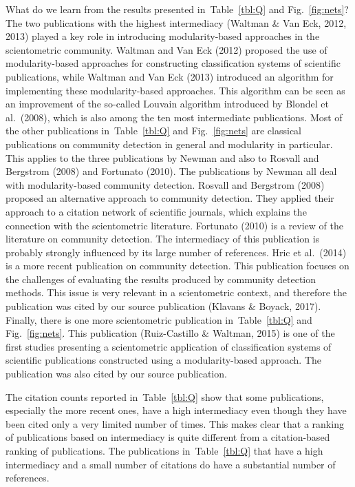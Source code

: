 \documentclass{article}
\theoremstyle{definition}
\newcommand{\figref}[1]{Fig.~\ref{fig:#1}\xspace}
\newcommand{\tblref}[1]{Table~\ref{tbl:#1}\xspace}
\begin{document}
What do we learn from the results presented in~\tblref{Q} and \figref{nets}? The two publications with the highest intermediacy (Waltman \& Van Eck, 2012, 2013) played a key role in introducing modularity-based approaches in the scientometric community. Waltman and Van Eck (2012) proposed the use of modularity-based approaches for constructing classification systems of scientific publications, while Waltman and Van Eck (2013) introduced an algorithm for implementing these modularity-based approaches. This algorithm can be seen as an improvement of the so-called Louvain algorithm introduced by Blondel et al.\ (2008), which is also among the ten most intermediate publications. Most of the other publications in~\tblref{Q} and \figref{nets} are classical publications on community detection in general and modularity in particular. This applies to the three publications by Newman and also to Rosvall and Bergstrom (2008) and Fortunato (2010). The publications by Newman all deal with modularity-based community detection. Rosvall and Bergstrom (2008) proposed an alternative approach to community detection. They applied their approach to a citation network of scientific journals, which explains the connection with the scientometric literature. Fortunato (2010) is a review of the literature on community detection. The intermediacy of this publication is probably strongly influenced by its large number of references. Hric et al.\ (2014) is a more recent publication on community detection. This publication focuses on the challenges of evaluating the results produced by community detection methods. This issue is very relevant in a scientometric context, and therefore the publication was cited by our source publication (Klavans \& Boyack, 2017). Finally, there is one more scientometric publication in~\tblref{Q} and \figref{nets}. This publication (Ruiz-Castillo \& Waltman, 2015) is one of the first studies presenting a scientometric application of classification systems of scientific publications constructed using a modularity-based approach. The publication was also cited by our source publication.

The citation counts reported in~\tblref{Q} show that some publications, especially the more recent ones, have a high intermediacy even though they have been cited only a very limited number of times. This makes clear that a ranking of publications based on intermediacy is quite different from a citation-based ranking of publications. The publications in~\tblref{Q} that have a high intermediacy and a small number of citations do have a substantial number of references.
\end{document}
